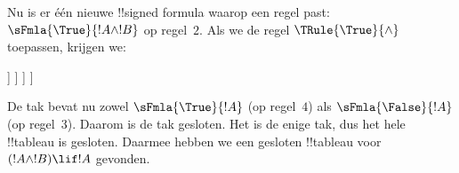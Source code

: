 \documentclass[openany]{memoir}
\begin{document}
\begin{ex}
Nu is er één nieuwe !!{signed formula} waarop een regel past:
$\sFmla{\True}{!A \land !B}$ op regel~$2$. Als we de regel
$\TRule{\True}{\land}$ toepassen, krijgen we:
\begin{oltableau}
  [\sFmla{\False}{(\formula{A} \land \formula{B}) \lif \formula{A}},
    checked, just = \TAss
    [\sFmla{\True}{\formula{A} \land \formula{B}},
      just={\TRule{\False}{\lif}[1]}, checked
      [\sFmla{\False}{\formula{A}}, just={\TRule{\False}{\lif}[1]}
        [\sFmla{\True}{\formula{A}}, just={\TRule{\True}{\land}[2]}
          [\sFmla{\True}{\formula{B}}, just={\TRule{\True}{\land}[2]}, close
          ]
        ]
      ]
    ]
  ]
\end{oltableau}
De tak bevat nu zowel $\sFmla{\True}{!A}$ (op regel~$4$) als
$\sFmla{\False}{!A}$ (op regel~$3$). Daarom is de tak gesloten. Het is
de enige tak, dus het hele !!{tableau} is gesloten. Daarmee hebben we
een gesloten !!{tableau} voor~$(!A \land !B) \lif !A$ gevonden.
\end{ex}
\end{document}
